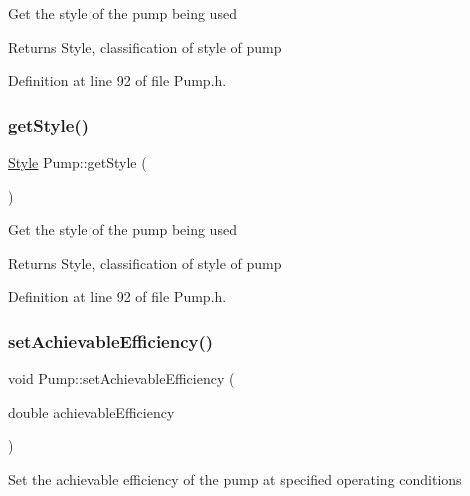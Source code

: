 Get the style of the pump being used

\begin{DoxyReturn}{Returns}
Style, classification of style of pump 
\end{DoxyReturn}


Definition at line 92 of file Pump.\+h.

\mbox{\label{class_pump_ab75d877769b5232c5ab7b4d92940579a}} 
\subsubsection{\texorpdfstring{get\+Style()}{getStyle()}\hspace{0.1cm}{\footnotesize\ttfamily [3/3]}}
{\footnotesize\ttfamily \hyperlink{class_pump_aef354601ce4218258cc898b35a1e90ff}{Style} Pump\+::get\+Style (\begin{DoxyParamCaption}{ }\end{DoxyParamCaption})\hspace{0.3cm}{\ttfamily [inline]}}

Get the style of the pump being used

\begin{DoxyReturn}{Returns}
Style, classification of style of pump 
\end{DoxyReturn}


Definition at line 92 of file Pump.\+h.

\mbox{\label{class_pump_a183f83fcc4b77e330451000df4d91046}} 
\subsubsection{\texorpdfstring{set\+Achievable\+Efficiency()}{setAchievableEfficiency()}\hspace{0.1cm}{\footnotesize\ttfamily [1/3]}}
{\footnotesize\ttfamily void Pump\+::set\+Achievable\+Efficiency (\begin{DoxyParamCaption}\item[{double}]{achievable\+Efficiency }\end{DoxyParamCaption})\hspace{0.3cm}{\ttfamily [inline]}}

Set the achievable efficiency of the pump at specified operating conditions


